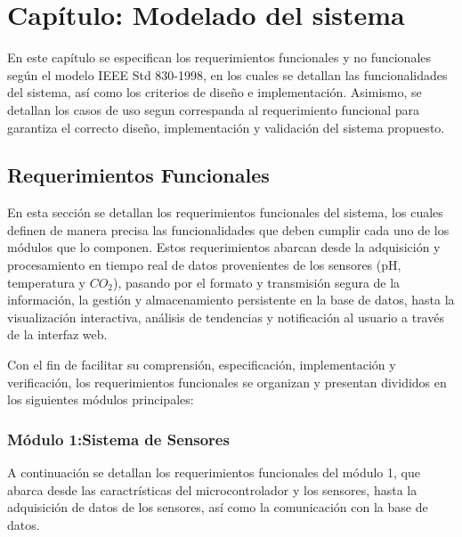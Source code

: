 \section{Capítulo: Modelado del sistema}


En este capítulo se especifican los requerimientos funcionales y no funcionales
según el modelo IEEE Std 830-1998, en los cuales 
se detallan las funcionalidades del sistema, así como los criterios de diseño
e implementación. Asimismo, se detallan los casos de uso segun 
correspanda al requerimiento funcional para garantiza el correcto diseño, 
implementación y validación del sistema 
propuesto.

\subsection{Requerimientos Funcionales}

En esta sección se detallan los requerimientos funcionales del sistema, 
los cuales definen de manera precisa las funcionalidades que deben cumplir cada uno de
los módulos que lo componen. Estos requerimientos abarcan desde la adquisición y procesamiento 
en tiempo real de datos provenientes de los sensores (pH, temperatura y $CO_{2}$), pasando por el 
formato y transmisión segura de la información, la gestión y almacenamiento persistente en la base 
de datos, hasta la visualización interactiva, análisis de tendencias y notificación al usuario a través
de la interfaz web. 

Con el fin de facilitar su comprensión, especificación, implementación y verificación, 
los requerimientos funcionales se organizan y presentan divididos en los siguientes módulos principales:

\subsubsection{Módulo 1:Sistema de Sensores}
A continuación se detallan los requerimientos funcionales del módulo 1, 
que abarca desde las caractrísticas del microcontrolador y los sensores, hasta
la adquisición de datos de los sensores, así como la comunicación con la base de datos.

